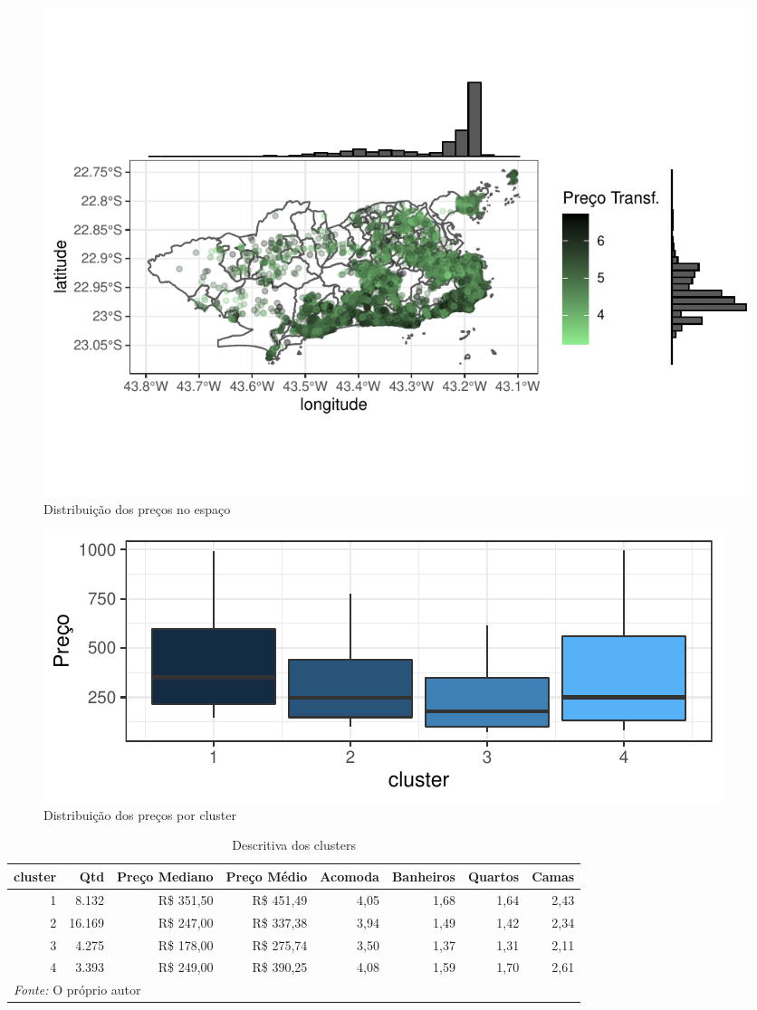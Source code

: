 \documentclass[
	12pt,				%
	a4paper,		%
	oneside,    %
	chapter=TITLE,		   %
	section=TITLE,		   %
	subsection=TITLE,	   %
	subsubsection=TITLE, %
	english,			%
	french,				%
	spanish,			%
	brazil,				%
]{abntex2}
\begin{document}
\begin{figure}
\centering
\includegraphics{00-TCC_files/figure-latex/dist_preco_espaco-1.pdf}
\caption{\label{dist_preco_espaco}Distribuição dos preços no espaço}
\end{figure}

\begin{figure}
\centering
\includegraphics{00-TCC_files/figure-latex/boxplot_cluster-1.pdf}
\caption{\label{boxplot_cluster}Distribuição dos preços por cluster}
\end{figure}

\begin{table}

\caption{\label{tab:resumo_cluster}Descritiva dos clusters}
\centering
\begin{tabular}[t]{r|r|r|r|r|r|r|r}
\hline
cluster & Qtd & Preço Mediano & Preço Médio & Acomoda & Banheiros & Quartos & Camas\\
\hline
1 & 8.132 & R\$ 351,50 & R\$ 451,49 & 4,05 & 1,68 & 1,64 & 2,43\\
\hline
2 & 16.169 & R\$ 247,00 & R\$ 337,38 & 3,94 & 1,49 & 1,42 & 2,34\\
\hline
3 & 4.275 & R\$ 178,00 & R\$ 275,74 & 3,50 & 1,37 & 1,31 & 2,11\\
\hline
4 & 3.393 & R\$ 249,00 & R\$ 390,25 & 4,08 & 1,59 & 1,70 & 2,61\\
\hline
\multicolumn{8}{l}{\textit{Fonte: } O próprio autor}\\
\end{tabular}
\end{table}
\end{document}

